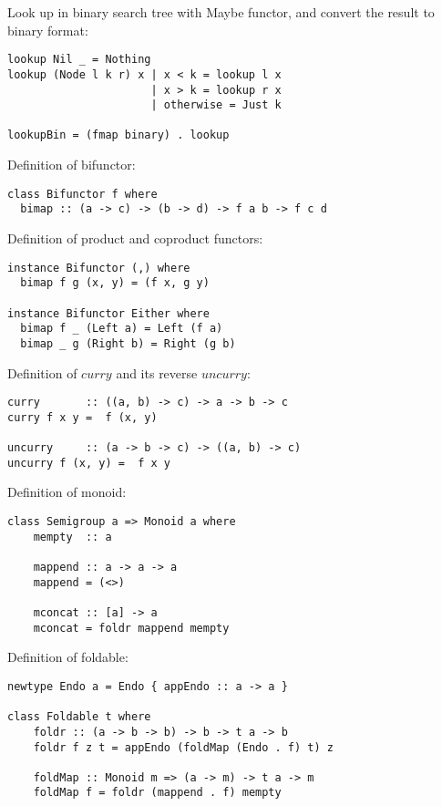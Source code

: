 \documentclass{article}
\begin{document}
Look up in binary search tree with Maybe functor, and convert the result to binary format:

\begin{lstlisting}[style=Haskell]
lookup Nil _ = Nothing
lookup (Node l k r) x | x < k = lookup l x
                      | x > k = lookup r x
                      | otherwise = Just k

lookupBin = (fmap binary) . lookup
\end{lstlisting}

Definition of bifunctor:

\begin{lstlisting}
class Bifunctor f where
  bimap :: (a -> c) -> (b -> d) -> f a b -> f c d
\end{lstlisting}

Definition of product and coproduct functors:

\begin{lstlisting}
instance Bifunctor (,) where
  bimap f g (x, y) = (f x, g y)

instance Bifunctor Either where
  bimap f _ (Left a) = Left (f a)
  bimap _ g (Right b) = Right (g b)
\end{lstlisting}

Definition of $curry$ and its reverse $uncurry$:

\begin{lstlisting}
curry       :: ((a, b) -> c) -> a -> b -> c
curry f x y =  f (x, y)

uncurry     :: (a -> b -> c) -> ((a, b) -> c)
uncurry f (x, y) =  f x y
\end{lstlisting}

Definition of monoid:

\begin{lstlisting}
class Semigroup a => Monoid a where
    mempty  :: a

    mappend :: a -> a -> a
    mappend = (<>)

    mconcat :: [a] -> a
    mconcat = foldr mappend mempty
\end{lstlisting}

Definition of foldable:

\begin{lstlisting}
newtype Endo a = Endo { appEndo :: a -> a }

class Foldable t where
    foldr :: (a -> b -> b) -> b -> t a -> b
    foldr f z t = appEndo (foldMap (Endo . f) t) z

    foldMap :: Monoid m => (a -> m) -> t a -> m
    foldMap f = foldr (mappend . f) mempty
\end{lstlisting}
\end{document}
